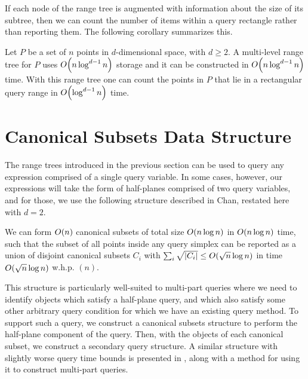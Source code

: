 If each node of the range tree is augmented with information about the size of its subtree, then we can count the number of items within a query rectangle rather than reporting them. The following corollary summarizes this.

\begin{corollary}
\label{cor:rangetree}
Let $P$ be a set of $n$ points in $d$-dimensional space, with $d \geq 2$. A multi-level range tree for $P$ uses $O\!\left(n \log^{d-1}{n}\right)$ storage and it can be constructed in $O\!\left(n \log^{d-1}{n}\right)$ time. With this range tree one can count the points in $P$ that lie in a rectangular query range in $O\!\left(\log^{d-1}{n}\right)$ time.
\end{corollary}


\section{Canonical Subsets Data Structure}
\label{:prelim:chan}

The range trees introduced in the previous section can be used to query any expression comprised of a single query variable.  In some cases, however, our expressions will take the form of half-planes comprised of two query variables, and for those, we use the following structure described in Chan\cite{chan2012}, restated here with $d=2$.

\begin{theorem}
\label{th:chan}
We can form $O\!\left(n\right)$ canonical subsets of total size $O\!\left(n \log{n}\right)$ in $O\!\left(n \log{n}\right)$ time, such that the subset of all points inside any query simplex can be reported as a union of disjoint canonical subsets $C_i$ with $\sum_i{\sqrt{|C_i|}} \leq O\!\left(\sqrt{n}\log{n}\right)$ in time $O\!\left(\sqrt{n}\log{n}\right)$ w.h.p. $(n)$.
\end{theorem}

This structure is particularly well-suited to multi-part queries where we need to identify objects which satisfy a half-plane query, and which also satisfy some other arbitrary query condition for which we have an existing query method.
To support such a query, we construct a canonical subsets structure to perform the half-plane component of the query. 
Then, with the objects of each canonical subset, we construct a secondary query structure.
A similar structure with slightly worse query time bounds is presented in \cite{debergch16}, along with a method for using it to construct multi-part queries.

